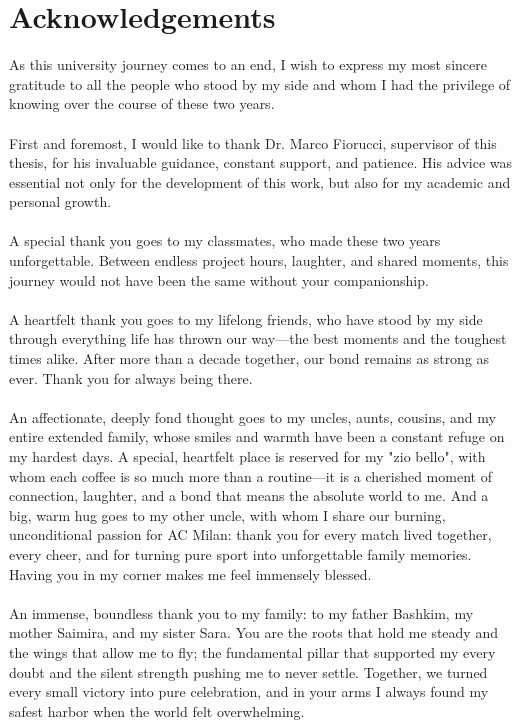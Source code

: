 \cleardoublepage
{}
{}




\bigskip

\begingroup
\let\clearpage\relax
\let\cleardoublepage\relax
\let\cleardoublepage\relax

\chapter*{Acknowledgements}
As this university journey comes to an end, I wish to express my most sincere gratitude to all the people who stood by my side and whom I had the privilege of knowing over the course of these two years. \\
\\
First and foremost, I would like to thank Dr. Marco Fiorucci, supervisor of this thesis, for his invaluable guidance, constant support, and patience. His advice was essential not only for the development of this work, but also for my academic and personal growth. \\
\\
A special thank you goes to my classmates, who made these two years unforgettable. Between endless project hours, laughter, and shared moments, this journey would not have been the same without your companionship. \\
\\
A heartfelt thank you goes to my lifelong friends, who have stood by my side through everything life has thrown our way—the best moments and the toughest times alike. After more than a decade together, our bond remains as strong as ever. Thank you for always being there.\\
\\
An affectionate, deeply fond thought goes to my uncles, aunts, cousins, and my entire extended family, whose smiles and warmth have been a constant refuge on my hardest days. A special, heartfelt place is reserved for my "zio bello", with whom each coffee is so much more than a routine—it is a cherished moment of connection, laughter, and a bond that means the absolute world to me. And a big, warm hug goes to my other uncle, with whom I share our burning, unconditional passion for AC Milan: thank you for every match lived together, every cheer, and for turning pure sport into unforgettable family memories. Having you in my corner makes me feel immensely blessed. \\
\\
An immense, boundless thank you to my family: to my father Bashkim, my mother Saimira, and my sister Sara. You are the roots that hold me steady and the wings that allow me to fly; the fundamental pillar that supported my every doubt and the silent strength pushing me to never settle. Together, we turned every small victory into pure celebration, and in your arms I always found my safest harbor when the world felt overwhelming.


